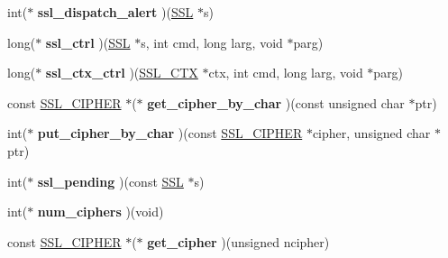 \begin{DoxyCompactItemize}
\item 
\hypertarget{structssl__method__st_a1164901a31bb98ce046b971a09b29321}{}int($\ast$ {\bfseries ssl\+\_\+dispatch\+\_\+alert} )(\hyperlink{structssl__st}{S\+S\+L} $\ast$s)\label{structssl__method__st_a1164901a31bb98ce046b971a09b29321}

\item 
\hypertarget{structssl__method__st_a00f03ff5d9c47885e4cf9340ccb91dd8}{}long($\ast$ {\bfseries ssl\+\_\+ctrl} )(\hyperlink{structssl__st}{S\+S\+L} $\ast$s, int cmd, long larg, void $\ast$parg)\label{structssl__method__st_a00f03ff5d9c47885e4cf9340ccb91dd8}

\item 
\hypertarget{structssl__method__st_a894ef584342f0b95ab4156cada689c99}{}long($\ast$ {\bfseries ssl\+\_\+ctx\+\_\+ctrl} )(\hyperlink{structssl__ctx__st}{S\+S\+L\+\_\+\+C\+T\+X} $\ast$ctx, int cmd, long larg, void $\ast$parg)\label{structssl__method__st_a894ef584342f0b95ab4156cada689c99}

\item 
\hypertarget{structssl__method__st_a51d27641af1ef292ad991acab889eb69}{}const \hyperlink{structssl__cipher__st}{S\+S\+L\+\_\+\+C\+I\+P\+H\+E\+R} $\ast$($\ast$ {\bfseries get\+\_\+cipher\+\_\+by\+\_\+char} )(const unsigned char $\ast$ptr)\label{structssl__method__st_a51d27641af1ef292ad991acab889eb69}

\item 
\hypertarget{structssl__method__st_a625829ff35be4426d905e44ea04024cf}{}int($\ast$ {\bfseries put\+\_\+cipher\+\_\+by\+\_\+char} )(const \hyperlink{structssl__cipher__st}{S\+S\+L\+\_\+\+C\+I\+P\+H\+E\+R} $\ast$cipher, unsigned char $\ast$ptr)\label{structssl__method__st_a625829ff35be4426d905e44ea04024cf}

\item 
\hypertarget{structssl__method__st_a8fd510a866d8754bfd60e897ccb8d3b4}{}int($\ast$ {\bfseries ssl\+\_\+pending} )(const \hyperlink{structssl__st}{S\+S\+L} $\ast$s)\label{structssl__method__st_a8fd510a866d8754bfd60e897ccb8d3b4}

\item 
\hypertarget{structssl__method__st_ad67301b9f432dca1d82eda0a2a73d402}{}int($\ast$ {\bfseries num\+\_\+ciphers} )(void)\label{structssl__method__st_ad67301b9f432dca1d82eda0a2a73d402}

\item 
\hypertarget{structssl__method__st_aa5b037fbac753dc98291d099d817a072}{}const \hyperlink{structssl__cipher__st}{S\+S\+L\+\_\+\+C\+I\+P\+H\+E\+R} $\ast$($\ast$ {\bfseries get\+\_\+cipher} )(unsigned ncipher)\label{structssl__method__st_aa5b037fbac753dc98291d099d817a072}


\end{DoxyCompactItemize}
